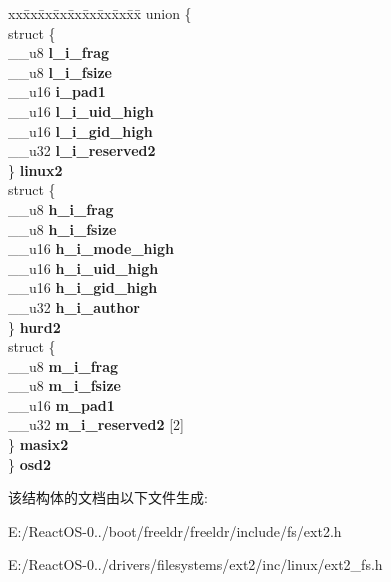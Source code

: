 \begin{DoxyCompactItemize}
\begin{tabbing}
\end{tabbing}\item 
\mbox{\label{structext2__inode_a3dba0ff78d884e984f642195167ff3f1}} 
\begin{tabbing}
xx\=xx\=xx\=xx\=xx\=xx\=xx\=xx\=xx\=\kill
union \{\\
\>struct \{\\
\>\>\_\_u8 {\bfseries l\_i\_frag}\\
\>\>\_\_u8 {\bfseries l\_i\_fsize}\\
\>\>\_\_u16 {\bfseries i\_pad1}\\
\>\>\_\_u16 {\bfseries l\_i\_uid\_high}\\
\>\>\_\_u16 {\bfseries l\_i\_gid\_high}\\
\>\>\_\_u32 {\bfseries l\_i\_reserved2}\\
\>\} {\bfseries linux2}\\
\>struct \{\\
\>\>\_\_u8 {\bfseries h\_i\_frag}\\
\>\>\_\_u8 {\bfseries h\_i\_fsize}\\
\>\>\_\_u16 {\bfseries h\_i\_mode\_high}\\
\>\>\_\_u16 {\bfseries h\_i\_uid\_high}\\
\>\>\_\_u16 {\bfseries h\_i\_gid\_high}\\
\>\>\_\_u32 {\bfseries h\_i\_author}\\
\>\} {\bfseries hurd2}\\
\>struct \{\\
\>\>\_\_u8 {\bfseries m\_i\_frag}\\
\>\>\_\_u8 {\bfseries m\_i\_fsize}\\
\>\>\_\_u16 {\bfseries m\_pad1}\\
\>\>\_\_u32 {\bfseries m\_i\_reserved2} \mbox{[}2\mbox{]}\\
\>\} {\bfseries masix2}\\
\} {\bfseries osd2}\\

\end{tabbing}\end{DoxyCompactItemize}


该结构体的文档由以下文件生成\+:\begin{DoxyCompactItemize}
\item 
E\+:/\+React\+O\+S-\/0../boot/freeldr/freeldr/include/fs/ext2.\+h\item 
E\+:/\+React\+O\+S-\/0../drivers/filesystems/ext2/inc/linux/ext2\+\_\+fs.\+h\end{DoxyCompactItemize}
